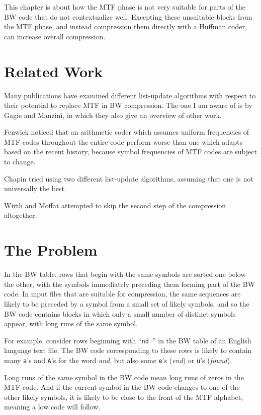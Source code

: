 \documentclass[a4paper]{scrreprt}
\begin{document}
This chapter is about how the MTF phase is not very suitable for parts of the BW
code that do not contextualize well. Excepting these unsuitable blocks from the
MTF phase, and instead compression them directly with a Huffman coder, can
increase overall compression.

\section{Related Work}

Many publications have examined different list-update algorithms with respect to
their potential to replace MTF in BW compression. The one I am aware of is by
Gagie and Manzini\cite{gagie2007listupdate}, in which they also give an overview
of other work.

Fenwick\cite{fenwick1996block} noticed that an arithmetic coder which assumes
uniform frequencies of MTF codes throughout the entire code perform worse than
one which adapts based on the recent history, because symbol frequencies of MTF
codes are subject to change.

Chapin\cite{chapin2000switching,chapin2001diss} tried using two different
list-update algorithms, assuming that one is not universally the best.

Wirth and Moffat\cite{wirth2001ranks} attempted to skip the second step of the
compression altogether.

\section{The Problem}

In the BW table, rows that begin with the same symbols are sorted one below the
other, with the symbols immediately preceding them forming part of the BW code.
In input files that are suitable for compression, the same sequences are likely
to be preceded by a symbol from a small set of likely symbols, and so the BW
code contains blocks in which only a small number of distinct symbols appear,
with long runs of the same symbol.

For example, consider rows beginning with ``\texttt{nd }'' in the BW table of an
English language text file. The BW code corresponding to these rows is likely to
contain many \texttt{a}'s and \texttt{A}'s for the word \emph{and}, but also
some \texttt{e}'s (\emph{end}) or \texttt{u}'s (\emph{found}).

Long runs of the same symbol in the BW code mean long runs of zeros in the MTF
code. And if the current symbol in the BW code changes to one of the other
likely symbols, it is likely to be close to the front of the MTF alphabet,
meaning a low code will follow.
\end{document}
